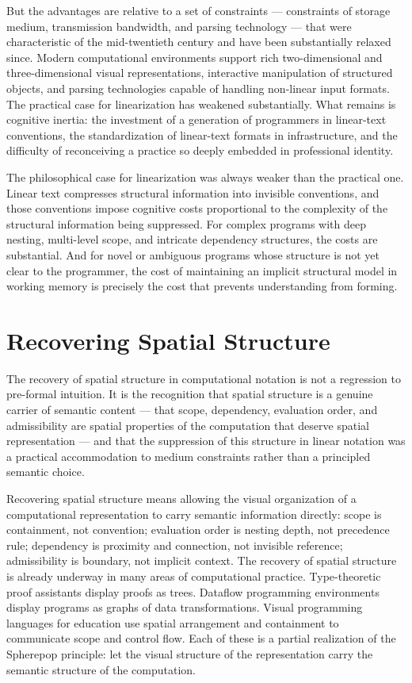 \documentclass[12pt,openany]{book}
\theoremstyle{plain}
\theoremstyle{definition}
\theoremstyle{remark}
\begin{document}
But the advantages are relative to a set of constraints — constraints of storage medium, transmission bandwidth, and parsing technology — that were characteristic of the mid-twentieth century and have been substantially relaxed since. Modern computational environments support rich two-dimensional and three-dimensional visual representations, interactive manipulation of structured objects, and parsing technologies capable of handling non-linear input formats. The practical case for linearization has weakened substantially. What remains is cognitive inertia: the investment of a generation of programmers in linear-text conventions, the standardization of linear-text formats in infrastructure, and the difficulty of reconceiving a practice so deeply embedded in professional identity.

The philosophical case for linearization was always weaker than the practical one. Linear text compresses structural information into invisible conventions, and those conventions impose cognitive costs proportional to the complexity of the structural information being suppressed. For complex programs with deep nesting, multi-level scope, and intricate dependency structures, the costs are substantial. And for novel or ambiguous programs whose structure is not yet clear to the programmer, the cost of maintaining an implicit structural model in working memory is precisely the cost that prevents understanding from forming.

\section{Recovering Spatial Structure}

The recovery of spatial structure in computational notation is not a regression to pre-formal intuition. It is the recognition that spatial structure is a genuine carrier of semantic content — that scope, dependency, evaluation order, and admissibility are spatial properties of the computation that deserve spatial representation — and that the suppression of this structure in linear notation was a practical accommodation to medium constraints rather than a principled semantic choice.

Recovering spatial structure means allowing the visual organization of a computational representation to carry semantic information directly: scope is containment, not convention; evaluation order is nesting depth, not precedence rule; dependency is proximity and connection, not invisible reference; admissibility is boundary, not implicit context. The recovery of spatial structure is already underway in many areas of computational practice. Type-theoretic proof assistants display proofs as trees. Dataflow programming environments display programs as graphs of data transformations. Visual programming languages for education use spatial arrangement and containment to communicate scope and control flow. Each of these is a partial realization of the Spherepop principle: let the visual structure of the representation carry the semantic structure of the computation.
\end{document}
